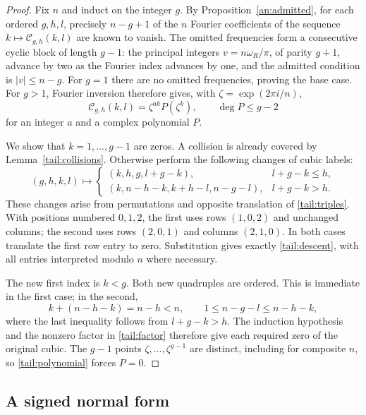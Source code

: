 \documentclass[11pt]{article}
\numberwithin{equation}{section}
\theoremstyle{definition}
\theoremstyle{remark}
\begin{document}
\begin{proof}
Fix $n$ and induct on the integer $g$.  By
Proposition~\ref{an:admitted}, for each ordered $g,h,l$, precisely
$n-g+1$ of the $n$ Fourier coefficients of the sequence
$k\mapsto\mathcal C_{g,h}(k,l)$ are known to vanish.
The omitted frequencies form a consecutive cyclic block of
length $g-1$: the principal integers $v=n\omega_R/\pi$,
of parity $g+1$, advance by two as the Fourier index advances
by one, and the admitted condition is $|v|\le n-g$.
For $g=1$ there are no omitted frequencies, proving the base case.
For $g>1$, Fourier inversion therefore gives, with
$\zeta=\exp(2\pi i/n)$,
\begin{equation}\label{tail:polynomial}
 \mathcal C_{g,h}(k,l)=\zeta^{ak}P(\zeta^k),\qquad
                         \deg P\le g-2
\end{equation}
for an integer $a$ and a complex polynomial $P$.

We show that $k=1,\ldots,g-1$ are zeros.  A collision is
already covered by Lemma~\ref{tail:collisions}.  Otherwise
perform the following changes of cubic labels:
\begin{equation}\label{tail:descent}
 (g,h,k,l)\longmapsto
 \begin{cases}
 (k,h,g,l+g-k),&l+g-k\le h,\\
 (k,n-h-k,k+h-l,n-g-l),&l+g-k>h.
 \end{cases}
\end{equation}
These changes arise from permutations and opposite translation
of \eqref{tail:triples}.  With positions numbered $0,1,2$,
the first uses rows $(1,0,2)$ and unchanged columns; the second
uses rows $(2,0,1)$ and columns $(2,1,0)$.  In both cases
translate the first row entry to zero.  Substitution gives
exactly \eqref{tail:descent}, with all entries interpreted
modulo $n$ where necessary.

The new first index is $k<g$.  Both new quadruples are ordered.
This is immediate in the first case; in the second,
\[
 k+(n-h-k)=n-h<n,\qquad
 1\le n-g-l\le n-h-k,
\]
where the last inequality follows from $l+g-k>h$.
The induction hypothesis and the nonzero factor in
\eqref{tail:factor} therefore give each required zero of the
original cubic.  The $g-1$ points
$\zeta,\ldots,\zeta^{g-1}$ are distinct, including for
composite $n$, so \eqref{tail:polynomial} forces $P=0$.
\end{proof}

\subsection{A signed normal form}
\end{document}
